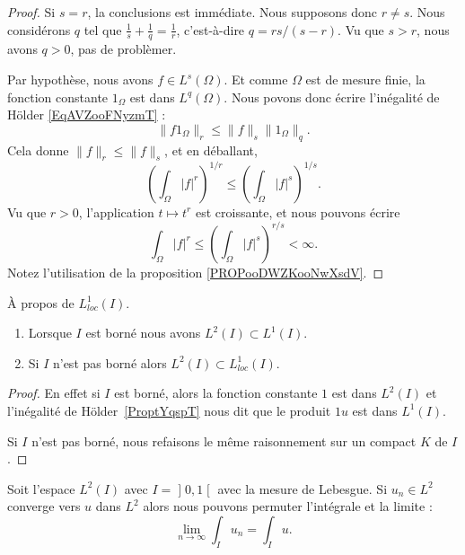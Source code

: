 \begin{proof}
	Si \( s=r\), la conclusions est immédiate. Nous supposons donc \( r\neq s\). Nous considérons \( q\) tel que \( \frac{1}{ s}+\frac{1}{ q}=\frac{1}{ r}\), c'est-à-dire \( q=rs/(s-r)\). Vu que \( s>r\), nous avons \( q>0\), pas de problèmer.

	Par hypothèse, nous avons \( f\in L^s(\Omega)\). Et comme \( \Omega\) est de mesure finie, la fonction constante \( 1_{\Omega}\) est dans \( L^q(\Omega)\). Nous povons donc écrire l'inégalité de Hölder \ref{EqAVZooFNyzmT} :
	\begin{equation}
		\| f1_{\Omega} \|_r\leq \| f \|_s\| 1_{\Omega} \|_q.
	\end{equation}
	Cela donne \( \| f \|_r\leq \| f \|_s\), et en déballant,
	\begin{equation}
		\left( \int_{\Omega}| f |^r \right)^{1/r}\leq \left( \int_{\Omega}| f |^s \right)^{1/s}.
	\end{equation}
	Vu que \( r>0\), l'application \( t\mapsto t^r\) est croissante, et nous pouvons écrire
	\begin{equation}
		\int_{\Omega}| f |^r\leq\left( \int_{\Omega}| f |^s \right)^{r/s}<\infty.
	\end{equation}
	Notez l'utilisation de la proposition \ref{PROPooDWZKooNwXsdV}.
\end{proof}

\begin{lemma}   \label{LemTLHwYzD}
	À propos de \( L^1_{loc}(I)\).
	\begin{enumerate}
		\item
		      Lorsque \( I\) est borné nous avons \( L^2(I)\subset L^1(I)\).
		\item
		      Si \( I\) n'est pas borné alors \( L^2(I)\subset L^1_{loc}(I)\).
	\end{enumerate}
\end{lemma}

\begin{proof}
	En effet si \( I\) est borné, alors la fonction constante \( 1\) est dans \( L^2(I)\) et l'inégalité de Hölder~\ref{ProptYqspT} nous dit que le produit \( 1u\) est dans \( L^1(I)\).

	Si \( I\) n'est pas borné, nous refaisons le même raisonnement sur un compact \( K\) de \( I\).
\end{proof}

\begin{corollary}        \label{CORooIIEAooNmbkTo}
	Soit l'espace \( L^2(I)\) avec \( I=\mathopen] 0 , 1 \mathclose[\) avec la mesure de Lebesgue. Si \( u_n\in L^2\) converge vers \( u\) dans \( L^2\) alors nous pouvons permuter l'intégrale et la limite :
	\begin{equation}
		\lim_{n\to \infty} \int_Iu_n=\int_Iu.
	\end{equation}
\end{corollary}

